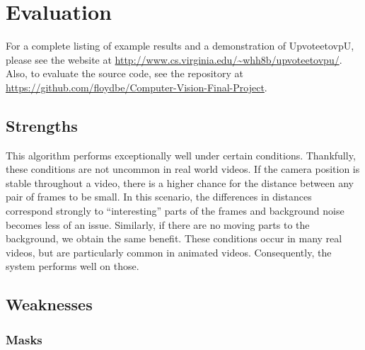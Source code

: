 \section{Evaluation}
\label{sec:Evaluation}
For a complete listing of example results and a demonstration of UpvoteetovpU, please see the website at \url{http://www.cs.virginia.edu/~whh8b/upvoteetovpu/}. Also, to evaluate the source code, see the repository at \url{https://github.com/floydbe/Computer-Vision-Final-Project}.
\subsection{Strengths}
\label{sec:Strengths}
This algorithm performs exceptionally well under certain conditions. Thankfully, these conditions are not uncommon in real world videos. If the camera position is stable throughout a video, there is a higher chance for the distance between any pair of frames to be small. In this scenario, the differences in distances correspond strongly to ``interesting'' parts of the frames and background noise becomes less of an issue. Similarly, if there are no moving parts to the background, we obtain the same benefit. These conditions occur in many real videos, but are particularly common in animated videos. Consequently, the system performs well on those.

\subsection{Weaknesses}
\label{sec:Weaknesses}
\subsubsection{Masks}
\label{sec:MasksWeaknesses}

